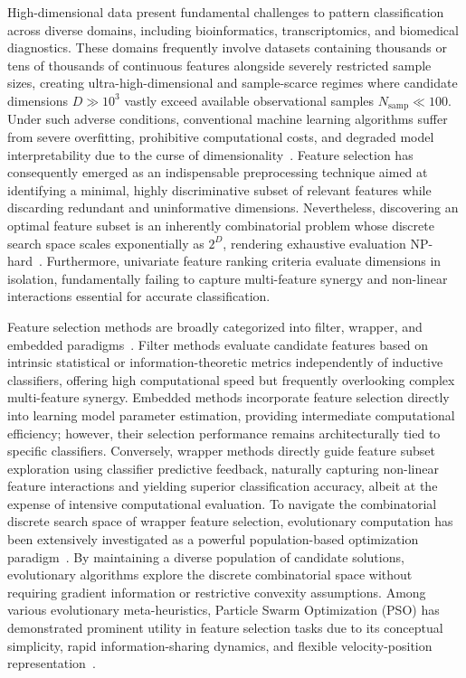 \documentclass[final,5p,times,fleqn]{elsarticle}
\begin{document}
High-dimensional data present fundamental challenges to pattern classification across diverse domains, including bioinformatics, transcriptomics, and biomedical diagnostics. These domains frequently involve datasets containing thousands or tens of thousands of continuous features alongside severely restricted sample sizes, creating ultra-high-dimensional and sample-scarce regimes where candidate dimensions $D \gg 10^3$ vastly exceed available observational samples $N_{\mathrm{samp}} \ll 100$. Under such adverse conditions, conventional machine learning algorithms suffer from severe overfitting, prohibitive computational costs, and degraded model interpretability due to the curse of dimensionality~\cite{lili2017,guyon2003}. Feature selection has consequently emerged as an indispensable preprocessing technique aimed at identifying a minimal, highly discriminative subset of relevant features while discarding redundant and uninformative dimensions. Nevertheless, discovering an optimal feature subset is an inherently combinatorial problem whose discrete search space scales exponentially as $2^D$, rendering exhaustive evaluation NP-hard~\cite{liang2025}. Furthermore, univariate feature ranking criteria evaluate dimensions in isolation, fundamentally failing to capture multi-feature synergy and non-linear interactions essential for accurate classification.

Feature selection methods are broadly categorized into filter, wrapper, and embedded paradigms~\cite{kohavi1997,lili2017}. Filter methods evaluate candidate features based on intrinsic statistical or information-theoretic metrics independently of inductive classifiers, offering high computational speed but frequently overlooking complex multi-feature synergy. Embedded methods incorporate feature selection directly into learning model parameter estimation, providing intermediate computational efficiency; however, their selection performance remains architecturally tied to specific classifiers. Conversely, wrapper methods directly guide feature subset exploration using classifier predictive feedback, naturally capturing non-linear feature interactions and yielding superior classification accuracy, albeit at the expense of intensive computational evaluation. To navigate the combinatorial discrete search space of wrapper feature selection, evolutionary computation has been extensively investigated as a powerful population-based optimization paradigm~\cite{xue2016survey,liang2025,song2024}. By maintaining a diverse population of candidate solutions, evolutionary algorithms explore the discrete combinatorial space without requiring gradient information or restrictive convexity assumptions. Among various evolutionary meta-heuristics, Particle Swarm Optimization (PSO) has demonstrated prominent utility in feature selection tasks due to its conceptual simplicity, rapid information-sharing dynamics, and flexible velocity-position representation~\cite{kennedy1995,shi1998,kennedy1997}.
\end{document}
